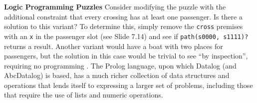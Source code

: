 \begin{minipage}[t]{\sw}
\slidenumber
\LARGE
{\bf Logic Programming Puzzles}\exx
Consider modifying the puzzle with the additional constraint
that every crossing has at least one passenger.
Is there a solution to this variant?
To determine this, simply remove the \verb'cross' premises
with an \verb'x' in the passenger slot (see Slide 7.14)
and see if \verb'path(s0000, s1111)?' returns a result.\exx
Another variant would have a boat with two places for passengers,
but the solution in this case would be trivial to see
``by inspection'', requiring no programming .\exx
The Prolog language, upon which Datalog (and AbcDatalog) is based,
has a much richer collection of data structures and operations
that lends itself to expressing a larger set of problems,
including those that require the use of lists and numeric operations.
\end{minipage}
